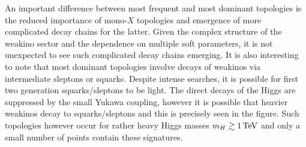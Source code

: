\documentclass[11pt,a4paper]{article}
\begin{document}
An important difference between most frequent and most dominant topologies is the reduced importance of mono-$X$ topologies and emergence of more complicated decay chains for the latter. Given the complex structure of the weakino sector and the dependence on multiple soft parameters, it is not unexpected to see such complicated decay chains emerging. It is also interesting to note that most dominant topologies involve decays of weakinos via intermediate sleptons or squarks. Despite intense searches, it is possible for first two generation squarks/sleptons to be light. The direct decays of the Higgs are suppressed by the small Yukawa coupling, however it is possible that heavier weakinos decay to squarks/sleptons and this is precisely seen in the figure. Such topologies however occur for rather heavy Higgs masses $m_H \gtrsim 1\,\rm{TeV}$ and only a small number of points contain these signatures.
%
\end{document}
